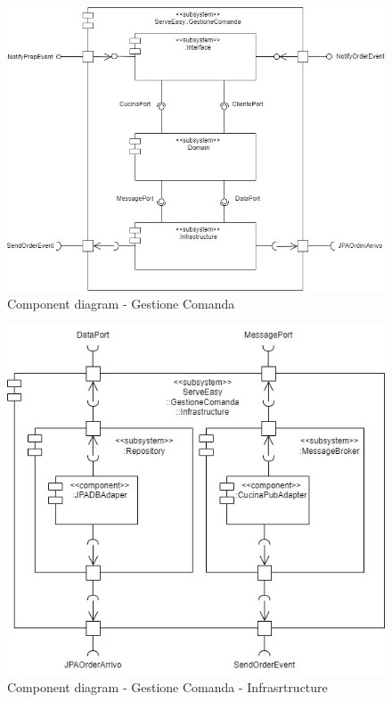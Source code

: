 \begin{figure}[htbp]
	\centering
	\includegraphics[scale=0.5]{iterazione1/images/component_comanda_cucina-GestioneComanda.jpg}
	\caption{Component diagram - Gestione Comanda\label{fig:component_diagram_gestione_comanda}}
\end{figure}

\begin{figure}[htbp]
	\centering
	\includegraphics[scale=0.5]{iterazione1/images/component_comanda_cucina-GestioneComanda__Infrastructure.jpg}
	\caption{Component diagram - Gestione Comanda - Infrasrtructure \label{fig:component_diagram_gestione_comanda_infrastracture}}
\end{figure}


